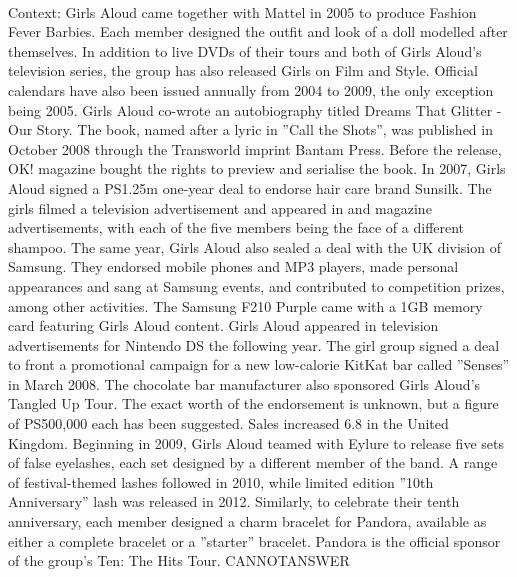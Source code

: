 \documentclass[11pt,a4paper, onecolumn]{article}
\begin{document}
\\ Context: Girls Aloud came together with Mattel in 2005 to produce Fashion Fever Barbies. Each member designed the outfit and look of a doll modelled after themselves. In addition to live DVDs of their tours and both of Girls Aloud's television series, the group has also released Girls on Film and Style. Official calendars have also been issued annually from 2004 to 2009, the only exception being 2005. Girls Aloud co-wrote an autobiography titled Dreams That Glitter - Our Story. The book, named after a lyric in ''Call the Shots'', was published in October 2008 through the Transworld imprint Bantam Press. Before the release, OK! magazine bought the rights to preview and serialise the book. In 2007, Girls Aloud signed a PS1.25m one-year deal to endorse hair care brand Sunsilk. The girls filmed a television advertisement and appeared in and magazine advertisements, with each of the five members being the face of a different shampoo. The same year, Girls Aloud also sealed a deal with the UK division of Samsung. They endorsed mobile phones and MP3 players, made personal appearances and sang at Samsung events, and contributed to competition prizes, among other activities. The Samsung F210 Purple came with a 1GB memory card featuring Girls Aloud content. Girls Aloud appeared in television advertisements for Nintendo DS the following year. The girl group signed a deal to front a promotional campaign for a new low-calorie KitKat bar called ''Senses'' in March 2008. The chocolate bar manufacturer also sponsored Girls Aloud's Tangled Up Tour. The exact worth of the endorsement is unknown, but a figure of PS500,000 each has been suggested. Sales increased 6.8  in the United Kingdom. Beginning in 2009, Girls Aloud teamed with Eylure to release five sets of false eyelashes, each set designed by a different member of the band. A range of festival-themed lashes followed in 2010, while limited edition ''10th Anniversary'' lash was released in 2012. Similarly, to celebrate their tenth anniversary, each member designed a charm bracelet for Pandora, available as either a complete bracelet or a ''starter'' bracelet. Pandora is the official sponsor of the group's Ten: The Hits Tour. CANNOTANSWER
\end{document}
